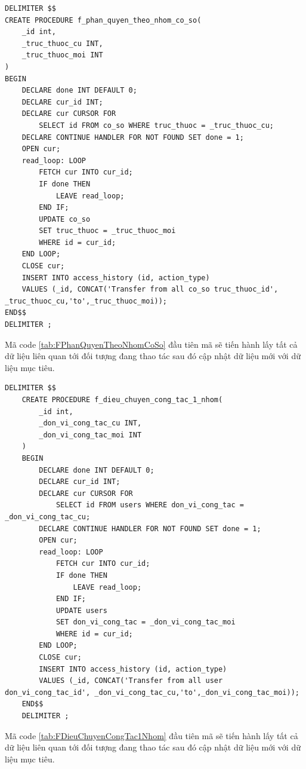 \documentclass{article} %
\begin{document}
\begin{lstlisting}[caption={FPhanQuyenTheoNhomCoSo Creater Procedure Definition}, label={tab:FPhanQuyenTheoNhomCoSo}]   
DELIMITER $$
CREATE PROCEDURE f_phan_quyen_theo_nhom_co_so(
	_id int,
    _truc_thuoc_cu INT,   
    _truc_thuoc_moi INT  
)
BEGIN
    DECLARE done INT DEFAULT 0;
    DECLARE cur_id INT;
    DECLARE cur CURSOR FOR
        SELECT id FROM co_so WHERE truc_thuoc = _truc_thuoc_cu;
    DECLARE CONTINUE HANDLER FOR NOT FOUND SET done = 1;
    OPEN cur;
    read_loop: LOOP
        FETCH cur INTO cur_id;  
        IF done THEN
            LEAVE read_loop;   
        END IF;
        UPDATE co_so
        SET truc_thuoc = _truc_thuoc_moi
        WHERE id = cur_id;
    END LOOP;
    CLOSE cur;
    INSERT INTO access_history (id, action_type)
	VALUES (_id, CONCAT('Transfer from all co_so truc_thuoc_id', _truc_thuoc_cu,'to',_truc_thuoc_moi));
END$$
DELIMITER ;
\end{lstlisting}

Mã code \ref{tab:FPhanQuyenTheoNhomCoSo} đầu tiên mã sẽ tiến hành lấy tất cả dữ liệu liên quan tới đối tượng đang thao tác sau đó cập nhật dữ liệu mới với dữ liệu mục tiêu.

\begin{lstlisting}[caption={FDieuChuyenCongTac1Nhom Creater Procedure Definition}, label={tab:FDieuChuyenCongTac1Nhom}]   
    DELIMITER $$
    CREATE PROCEDURE f_dieu_chuyen_cong_tac_1_nhom(
        _id int,
        _don_vi_cong_tac_cu INT,   
        _don_vi_cong_tac_moi INT 
    )
    BEGIN
        DECLARE done INT DEFAULT 0;
        DECLARE cur_id INT;
        DECLARE cur CURSOR FOR
            SELECT id FROM users WHERE don_vi_cong_tac = _don_vi_cong_tac_cu;
        DECLARE CONTINUE HANDLER FOR NOT FOUND SET done = 1;
        OPEN cur;
        read_loop: LOOP
            FETCH cur INTO cur_id;  
            IF done THEN
                LEAVE read_loop;  
            END IF;
            UPDATE users
            SET don_vi_cong_tac = _don_vi_cong_tac_moi
            WHERE id = cur_id;
        END LOOP;
        CLOSE cur;
        INSERT INTO access_history (id, action_type)
        VALUES (_id, CONCAT('Transfer from all user don_vi_cong_tac_id', _don_vi_cong_tac_cu,'to',_don_vi_cong_tac_moi));
    END$$
    DELIMITER ;
\end{lstlisting}

Mã code \ref{tab:FDieuChuyenCongTac1Nhom} đầu tiên mã sẽ tiến hành lấy tất cả dữ liệu liên quan tới đối tượng đang thao tác sau đó cập nhật dữ liệu mới với dữ liệu mục tiêu.
\end{document}
